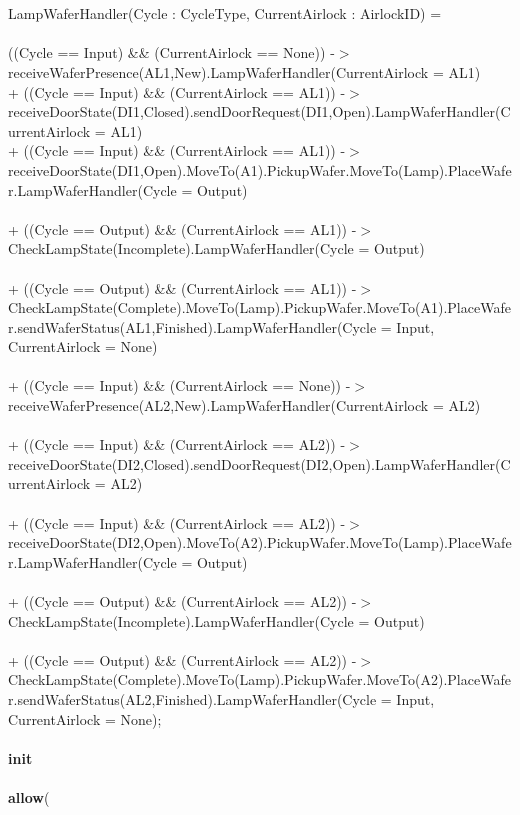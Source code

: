 \documentclass[a4paper,12pt]{article}
\begin{document}
\\
\\LampWaferHandler(Cycle : CycleType, CurrentAirlock : AirlockID) = 
\\
\\((Cycle == Input) \&\& (CurrentAirlock == None)) -$>$ receiveWaferPresence(AL1,New).LampWaferHandler(CurrentAirlock = AL1)
\\+ ((Cycle == Input) \&\& (CurrentAirlock == AL1)) -$>$ receiveDoorState(DI1,Closed).sendDoorRequest(DI1,Open).LampWaferHandler(CurrentAirlock = AL1)
\\+ ((Cycle == Input) \&\& (CurrentAirlock == AL1)) -$>$ receiveDoorState(DI1,Open).MoveTo(A1).PickupWafer.MoveTo(Lamp).PlaceWafer.LampWaferHandler(Cycle = Output)
\\
\\+ ((Cycle == Output) \&\& (CurrentAirlock == AL1)) -$>$ CheckLampState(Incomplete).LampWaferHandler(Cycle = Output)
\\
\\+ ((Cycle == Output) \&\& (CurrentAirlock == AL1)) -$>$ CheckLampState(Complete).MoveTo(Lamp).PickupWafer.MoveTo(A1).PlaceWafer.sendWaferStatus(AL1,Finished).LampWaferHandler(Cycle = Input, CurrentAirlock = None)
\\
\\+ ((Cycle == Input) \&\& (CurrentAirlock == None)) -$>$ receiveWaferPresence(AL2,New).LampWaferHandler(CurrentAirlock = AL2)
\\
\\+ ((Cycle == Input) \&\& (CurrentAirlock == AL2)) -$>$ receiveDoorState(DI2,Closed).sendDoorRequest(DI2,Open).LampWaferHandler(CurrentAirlock = AL2)
\\
\\+ ((Cycle == Input) \&\& (CurrentAirlock == AL2)) -$>$ receiveDoorState(DI2,Open).MoveTo(A2).PickupWafer.MoveTo(Lamp).PlaceWafer.LampWaferHandler(Cycle = Output)
\\
\\+ ((Cycle == Output) \&\& (CurrentAirlock == AL2)) -$>$ CheckLampState(Incomplete).LampWaferHandler(Cycle = Output)
\\
\\+ ((Cycle == Output) \&\& (CurrentAirlock == AL2)) -$>$ CheckLampState(Complete).MoveTo(Lamp).PickupWafer.MoveTo(A2).PlaceWafer.sendWaferStatus(AL2,Finished).LampWaferHandler(Cycle = Input, CurrentAirlock = None);
\\
\\\textbf{init} 
\\
\\\textbf{			allow}(
\end{document}
